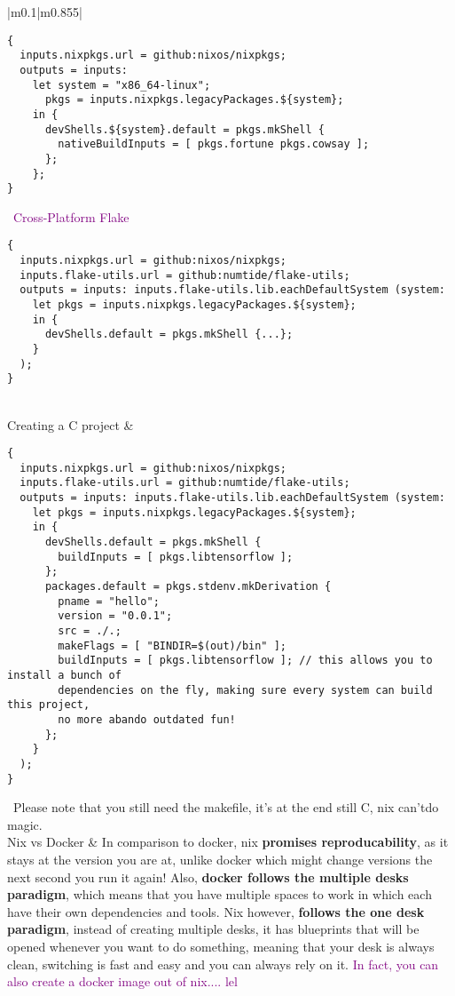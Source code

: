 \documentclass[main.tex,fontsize=8pt,paper=a4,paper=portrait,DIV=calc,]{scrartcl}
\begin{document}
\begin{table}[h!]
\begin{tabular}{|m{0.1\linewidth}|m{0.855\linewidth}|}
\begin{lstlisting}
{
  inputs.nixpkgs.url = github:nixos/nixpkgs;
  outputs = inputs:
    let system = "x86_64-linux";
      pkgs = inputs.nixpkgs.legacyPackages.${system};
    in {
      devShells.${system}.default = pkgs.mkShell {
        nativeBuildInputs = [ pkgs.fortune pkgs.cowsay ];
      };
    };
}
\end{lstlisting}
\, \newline
\textcolor{purple}{Cross-Platform Flake}
\begin{lstlisting}
{
  inputs.nixpkgs.url = github:nixos/nixpkgs;
  inputs.flake-utils.url = github:numtide/flake-utils;
  outputs = inputs: inputs.flake-utils.lib.eachDefaultSystem (system:
    let pkgs = inputs.nixpkgs.legacyPackages.${system};
    in {
      devShells.default = pkgs.mkShell {...};
    }
  );
}
\end{lstlisting}
\\
\hline
Creating a C project & 
\vspace{2mm}
\begin{lstlisting}
{
  inputs.nixpkgs.url = github:nixos/nixpkgs;
  inputs.flake-utils.url = github:numtide/flake-utils;
  outputs = inputs: inputs.flake-utils.lib.eachDefaultSystem (system:
    let pkgs = inputs.nixpkgs.legacyPackages.${system};
    in {
      devShells.default = pkgs.mkShell {
        buildInputs = [ pkgs.libtensorflow ];
      };
      packages.default = pkgs.stdenv.mkDerivation {
        pname = "hello";
        version = "0.0.1";
        src = ./.;
        makeFlags = [ "BINDIR=$(out)/bin" ];
        buildInputs = [ pkgs.libtensorflow ]; // this allows you to install a bunch of 
        dependencies on the fly, making sure every system can build this project,
        no more abando outdated fun!
      };
    }
  );
}
\end{lstlisting}
\, \newline
Please note that you still need the makefile, it's at the end still C, nix can'tdo magic.
\\
\hline
Nix vs Docker & 
In comparison to docker, nix \textbf{promises reproducability}, as it stays at the version you are at, unlike docker which might change versions the next second you run it again!\newline
Also, \textbf{docker follows the multiple desks paradigm}, which means that you have multiple spaces to work in which each have their own dependencies and tools.\newline
Nix however, \textbf{follows the one desk paradigm}, instead of creating multiple desks, it has blueprints that will be opened whenever you want to do something, meaning that your desk is always clean, switching is fast and easy and you can always rely on it.\newline
\textcolor{purple}{In fact, you can also create a docker image out of nix.... lel}
\\
\hline
\end{tabular}
\end{table}
\end{document}
